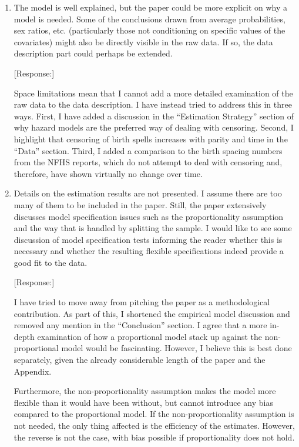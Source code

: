 \documentclass[letterpaper,12pt]{article}
\begin{document}
\begin{enumerate}

\item The model is well explained, but the paper could be more explicit
on why a model is needed. Some of the conclusions drawn from average
probabilities, sex ratios, etc. (particularly those not conditioning on
specific values of the covariates) might also be directly visible in the
raw data. If so, the data description part could perhaps be extended.

[Response:]

Space limitations mean that I cannot add a more detailed examination of
the raw data to the data description. I have instead tried to address
this in three ways. First, I have added a discussion in the ``Estimation
Strategy'' section of why hazard models are the preferred way of dealing
with censoring. Second, I highlight that censoring of birth spells
increases with parity and time in the ``Data'' section. Third, I added a
comparison to the birth spacing numbers from the NFHS reports, which do
not attempt to deal with censoring and, therefore, have shown virtually
no change over time. 



\item Details on the estimation results are not presented. I assume
there are too many of them to be included in the paper. Still, the paper
extensively discusses model specification issues such as the
proportionality assumption and the way that is handled by splitting the
sample. I would like to see some discussion of model specification tests
informing the reader whether this is necessary and whether the resulting
flexible specifications indeed provide a good fit to the data.


[Response:]

I have tried to move away from pitching the paper as a methodological
contribution. As part of this, I shortened the empirical model
discussion and removed any mention in the ``Conclusion'' section. I
agree that a more in-depth examination of how a proportional model stack
up against the non-proportional model would be fascinating. However, I
believe this is best done separately, given the already considerable
length of the paper and the Appendix.

Furthermore, the non-proportionality assumption makes the model more
flexible than it would have been without, but cannot introduce any bias
compared to the proportional model. If the non-proportionality
assumption is not needed, the only thing affected is the efficiency of
the estimates. However, the reverse is not the case, with bias possible
if proportionality does not hold.



\end{enumerate}
\end{document}
